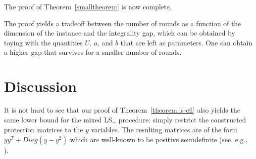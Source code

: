 \documentclass[11pt]{article}\usepackage{amsmath}
\newcommand{\cfl}{{\sc Cfl}}
\begin{document}
The proof of Theorem~\ref{smalltheorem} is now complete.






The proof yields a tradeoff between 
the number of rounds as a function of the dimension of the instance  
and the integrality gap, 
which can be obtained by toying with the quantities $U$, $a$, and $b$ that are
left as parameters. One can obtain a higher gap that survives for a
smaller number of rounds. 







\iffalse ---------- moved before the proof ----------

It is well-known that some simple inequalities are not produced early in the LS procedure.
For example, in the case of \cfl\ 
our proof implies that $\Theta(n)$ rounds
are required to obtain the simple inequality $\sum_{i \in F}  y_i \geq \lceil
|{C}| / U  \rceil$ which is facet-inducing for our instance. 
It is easy to modify the input by adding appropriate clusters of facilities and
clients at a large distance from each other, so that our proof continues to hold 
while inequalities of this flavor  are  satisfied by the bad fractional solution.
This would mean  that such inequalities alone
fail to capture the "core" of the difficulty
of the instance.


\fi 






\section{Discussion}\label{disc}
\label{sec:open}



It is not hard to see that our proof of Theorem~\ref{theorem:ls-cfl} 
also yields the same lower bound 
for the mixed LS$_{+}$ \cite{Cornuejols08}
procedure:  simply restrict  the constructed  protection  matrices  to the  $y$
variables. The  resulting matrices  are of the  form $yy^T +  Diag(y -
y^2)$   which    are   well-known   to    be   positive   semidefinite
(see, e.g., \cite{GoemansT01}). 
\end{document}
